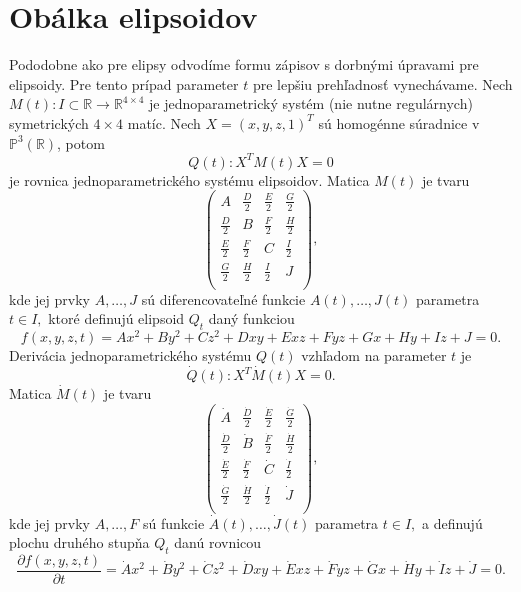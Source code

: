 \section{Obálka elipsoidov}
Pododobne ako pre elipsy odvodíme formu zápisov s dorbnými úpravami pre elipsoidy. Pre tento prípad parameter $t$ pre lepšiu prehľadnosť vynechávame.
Nech $M(t) \colon I \subset \mathbb{R} \rightarrow \mathbb{R}^{4 \times 4}$ je jednoparametrický systém (nie nutne regulárnych) symetrických $4 \times 4$ matíc. Nech $ X = (x, y, z, 1)^T$ sú homogénne súradnice v $\mathbb{P}^3(\mathbb{R})$, potom
\begin{equation*}
Q(t) \colon X^T M(t) X = 0
\end{equation*}
je rovnica jednoparametrického systému elipsoidov. Matica $M(t)$ je tvaru
$$
\left(\begin{matrix} 
A & \frac{D}{2} & \frac{E}{2} & \frac{G}{2} \\
\frac{D}{2} & B & \frac{F}{2} & \frac{H}{2} \\
\frac{E}{2} & \frac{F}{2} & C & \frac{I}{2} \\
\frac{G}{2} & \frac{H}{2} & \frac{I}{2} & J \\
\end{matrix} \right),
$$
kde jej prvky $A, \dots, J$ sú diferencovateľné funkcie $A(t), \dots, J(t)$ parametra $t \in I,$ ktoré definujú elipsoid $Q_t$ daný funkciou 
$$
f(x, y, z, t) = Ax^2 + By^2 + Cz^2 + Dxy + Exz + Fyz + Gx + Hy + Iz + J = 0.
$$
Derivácia jednoparametrického systému $Q(t)$ vzhľadom na parameter $t$ je 
\begin{equation*}
\dot{Q}(t) \colon X^T \dot{M}(t) X = 0.
\end{equation*}
Matica $\dot{M}(t)$ je tvaru
$$
\left(\begin{matrix} 
\dot{A} & \frac{\dot{D}}{2} & \frac{\dot{E}}{2} & \frac{\dot{G}}{2} \\
\frac{\dot{D}}{2} & \dot{B} & \frac{\dot{F}}{2} & \frac{\dot{H}}{2} \\
\frac{\dot{E}}{2} & \frac{\dot{F}}{2} & \dot{C} & \frac{\dot{I}}{2} \\
\frac{\dot{G}}{2} & \frac{\dot{H}}{2} & \frac{\dot{I}}{2} & \dot{J} \\
\end{matrix} \right),
$$
kde jej prvky $A, \dots, F$ sú funkcie $\dot{A}(t), \dots, \dot{J}(t)$ parametra $t \in I,$ a definujú plochu druhého stupňa $Q_t$ danú rovnicou 
$$\dfrac{\partial f(x, y, z, t)}{\partial t} = \dot{A}x^2 + \dot{B}y^2 + \dot{C}z^2 + \dot{D}xy + \dot{E}xz + \dot{F}yz + \dot{G}x + \dot{H}y + \dot{I}z + \dot{J} = 0.$$
